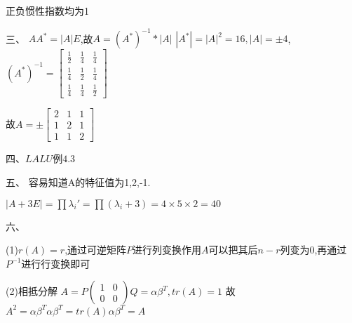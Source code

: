 \documentclass[UTF8]{article}
\begin{document}
     \par
     正负惯性指数均为1
\par
三、
     $A{A}^*={\left\lvert A\right\rvert}E$,故$A=(A^*)^{-1}*\left\lvert A\right\rvert $
     $|A^*|=|A|^2=16,|A|=±4$,
     $(A^*)^{-1}=\begin{bmatrix} \frac{1}{2}&\frac{1}{4}&\frac{1}{4} \\ \frac{1}{4}&\frac{1}{2}&\frac{1}{4}\\\frac{1}{4}&\frac{1}{4}&\frac{1}{2}  \end{bmatrix}$
\par
     故$A=\pm\begin{bmatrix}2&1&1\\1&2&1\\1&1&2 \end{bmatrix}$
\par
     四、$LALU$例$4.3$
\par
五、
     容易知道A的特征值为1,2,-1.

     $|A+3E| = \prod \lambda_i' = \prod (\lambda_{i}+3) = 4 \times 5 \times 2 = 40$
     \par
\par
六、
\par
   (1)$r(A)=r$,通过可逆矩阵$P$进行列变换作用$A$可以把其后$n-r$列变为0,再通过$P^{-1}$进行行变换即可 
\par 
    (2)相抵分解
   $A=P \left(\begin{matrix}1&0\\0&0\end{matrix}\right) Q=\alpha\beta^T,tr(A)=1$
   故$A^2=\alpha\beta^T\alpha\beta^T=tr (A)\alpha\beta^T=A$
\end{document}
